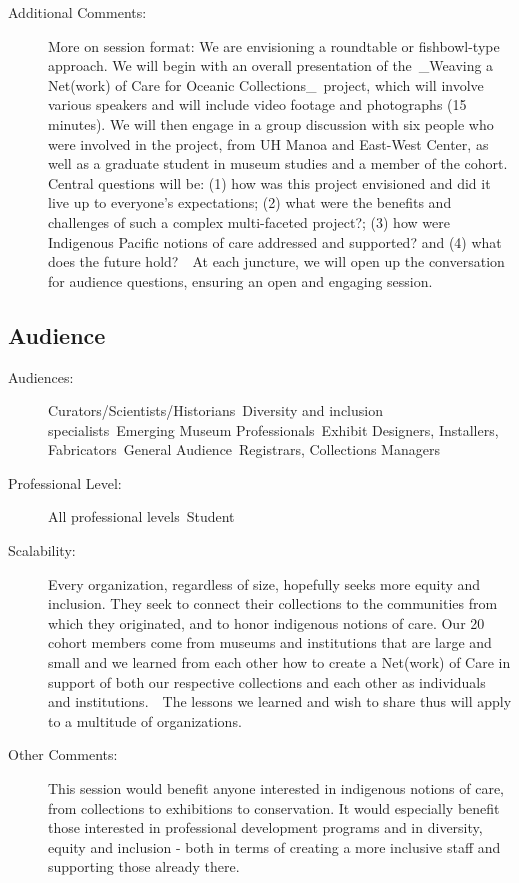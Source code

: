 \documentclass{report}
\begin{document}
\begin{description}
                    \item [Additional Comments: ]More on session format: We are envisioning a roundtable or fishbowl-type approach. We will begin with an overall presentation of the \_Weaving a Net(work) of Care for Oceanic Collections\_ project, which will involve various speakers and will include video footage and photographs (15 minutes). We will then engage in a group discussion with six people who were involved in the project, from UH Manoa and East-West Center, as well as a graduate student in museum studies and a member of the cohort. Central questions will be: (1) how was this project envisioned and did it live up to everyone's expectations; (2) what were the benefits and challenges of such a complex multi-faceted project?; (3) how were Indigenous Pacific notions of care addressed and supported? and (4) what does the future hold?  At each juncture, we will open up the conversation for audience questions, ensuring an open and engaging session. 

                \end{description}
              \subsection*{Audience}
                \begin{description}
                  \item [Audiences:]Curators/Scientists/Historians~Diversity and inclusion specialists~Emerging Museum Professionals~Exhibit Designers, Installers, Fabricators~General Audience~Registrars, Collections Managers~
                  \item[Professional Level:]All professional levels~Student~
                \item[Scalability:] Every organization, regardless of size, hopefully seeks more equity and inclusion. They seek to connect their collections to the communities from which they originated, and to honor indigenous notions of care. Our 20 cohort members come from museums and institutions that are large and small and we learned from each other how to create a Net(work) of Care in support of both our respective collections and each other as individuals and institutions.  The lessons we learned and wish to share thus will apply to a multitude of organizations. 

							
              \item[Other Comments:] This session would benefit anyone interested in indigenous notions of care, from collections to exhibitions to conservation. It would especially benefit those interested in professional development programs and in diversity, equity and inclusion - both in terms of creating a more inclusive staff and supporting those already there.
              \end{description}
\end{document}
